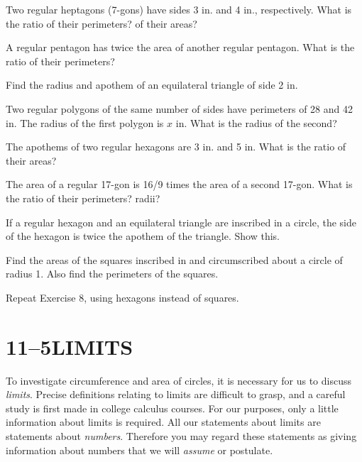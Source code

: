 \documentclass[11pt]{book}
\theoremstyle{XIplainnote}
\theoremstyle{bkplain}
\begin{document}
\begin{exercisecols}
\begin{exlist}
\item Two regular heptagons (7-gons) have sides 3 in. and 4 in., respectively.
      What is the ratio of their perimeters? of their areas?
\item A regular pentagon has twice the area of another regular pentagon. What
      is the ratio of their perimeters?
\item Find the radius and apothem of an equilateral triangle of side 2 in.
\item Two regular polygons of the same number of sides have perimeters of 28
      and 42 in. The radius of the first polygon is $x$ in. What is the radius
      of the second?
\item The apothems of two regular hexagons are 3 in. and 5 in. What is the
      ratio of their areas?
\item The area of a regular 17-gon is 16/9 times the area of a second 17-gon.
      What is the ratio of their perimeters? radii?
\item If a regular hexagon and an equilateral triangle are inscribed in a
      circle, the side of the hexagon is twice the apothem of the triangle.
      Show this.
\item Find the areas of the squares inscribed in and circumscribed about a
      circle of radius 1. Also find the perimeters of the squares.
\item Repeat Exercise 8, using hexagons instead of squares.
\end{exlist}
\end{exercisecols}

\section*{11--5\quad LIMITS}

To investigate circumference and area of circles, it is necessary for us to
discuss \emph{limits}. Precise definitions relating to limits are difficult to
grasp, and a careful study is first made in college calculus courses. For our
purposes, only a little information about limits is required. All our
statements about limits are statements about \emph{numbers}. Therefore you may
regard these statements as giving information about numbers that we will
\emph{assume} or postulate.
\end{document}
